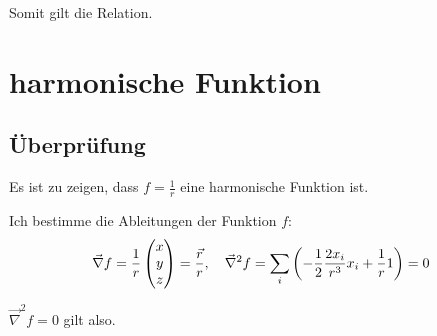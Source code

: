 \documentclass[11pt, ngerman]{article}
\newcommand{\laplace}{\vnabla^2}
\newcommand{\vnabla}{\vec \nabla}
\begin{document}
Somit gilt die Relation.

\section{harmonische Funktion}

\subsection{Überprüfung}

Es ist zu zeigen, dass $f = \frac 1r$ eine harmonische Funktion ist.

Ich bestimme die Ableitungen der Funktion $f$:
\[
	\vnabla f = \frac{1}{r} \begin{pmatrix}
		x \\ y \\ z
	\end{pmatrix} = \frac{\vec r}{r}
	,\quad
	\laplace f = \sum_i \del{- \frac12 \frac{2x_i}{r^3} x_i + \frac 1r 1} = 0
\]

$\laplace f = 0$ gilt also.



\end{document}
